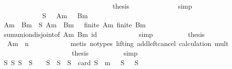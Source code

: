 \begin{isabellebody}
\isanewline
\ \ \ \ \ \ \ \ \ \ \isamarkupfalse%
\isanewline
\isanewline
\ \ \ \ \ \ \ \ \ \ \isamarkupfalse%
\isanewline
\ \ \ \ \ \ \ \ \ \ \isamarkupfalse%
\ {\isacharquery}thesis\isanewline
\ \ \ \ \ \ \ \ \ \ \ \ \isamarkupfalse%
\ simp\isanewline
\ \ \ \ \ \ \ \ \isamarkupfalse%
\isanewline
\ \ \ \ \ \ \ \ \isamarkupfalse%
\ \isamarkupfalse%
\ {\isachardoublequoteopen}{\isasymSum}\ {\isacharquery}S\ {\isacharequal}\ {\isasymSum}\ {\isacharquery}Am\ {\isacharplus}\ {\isasymSum}\ {\isacharquery}Bm{\isachardoublequoteclose}\isanewline
\ \ \ \ \ \ \ \ \ \ \isamarkupfalse%
\ {\isacharbackquoteopen}{\isacharquery}Am\ {\isasymunion}\ {\isacharquery}Bm\ {\isacharequal}\ {\isacharquery}S{\isacharbackquoteclose}\ {\isacharbackquoteopen}{\isacharquery}Am\ {\isasyminter}\ {\isacharquery}Bm\ {\isacharequal}\ {\isacharbraceleft}{\isacharbraceright}{\isacharbackquoteclose}\ {\isacharbackquoteopen}finite\ {\isacharquery}Am{\isacharbackquoteclose}\ {\isacharbackquoteopen}finite\ {\isacharquery}Bm{\isacharbackquoteclose}\isanewline
\ \ \ \ \ \ \ \ \ \ \isamarkupfalse%
\ sum{\isachardot}union{\isacharunderscore}disjoint{\isacharbrackleft}of\ {\isacharquery}Am\ {\isacharquery}Bm\ id{\isacharbrackright}\isanewline
\ \ \ \ \ \ \ \ \ \ \isamarkupfalse%
\ simp\isanewline
\ \ \ \ \ \ \ \ \isamarkupfalse%
\ {\isacharquery}thesis\isanewline
\ \ \ \ \ \ \ \ \ \ \isamarkupfalse%
\ {\isacharbackquoteopen}{\isasymSum}\ {\isacharquery}Am\ {\isacharequal}\ {}{\isacharcircum}n{\isacharbackquoteclose}\isanewline
\ \ \ \ \ \ \ \ \ \ \isamarkupfalse%
\ {\isacharparenleft}metis\ {\isacharparenleft}no{\isacharunderscore}types{\isacharcomma}\ lifting{\isacharparenright}\ add{\isacharunderscore}left{\isacharunderscore}cancel\ calculation\ mult{\isacharunderscore}{}{\isacharparenright}\isanewline
\ \ \ \ \ \ \isamarkupfalse%
\isanewline
\isanewline
\ \ \ \ \ \ \isamarkupfalse%
\isanewline
\isanewline
\ \ \ \ \ \ \isamarkupfalse%
\ {\isacharquery}thesis\isanewline
\ \ \ \ \ \ \ \ \isamarkupfalse%
\ simp\isanewline
\ \ \ \ \isamarkupfalse%
\isanewline
\isanewline
\ \ \ \ \isamarkupfalse%
\isanewline
\isanewline
\ \ \ \ \isamarkupfalse%
\ {\isachardoublequoteopen}{\isasymexists}S{}\ S{}{\isachardot}\ S{}\ {\isasyminter}\ S{}\ {\isacharequal}\ {\isacharbraceleft}{\isacharbraceright}\ {\isasymand}\ S{}\ {\isasymunion}\ S{}\ {\isacharequal}\ {\isacharquery}S\ {\isasymand}\ card\ S{}\ {\isacharequal}\ m\ {\isasymand}\ {\isasymSum}\ S{}\ {\isacharequal}\ {\isasymSum}\ S{}{\isachardoublequoteclose}\isanewline

\end{isabellebody}
